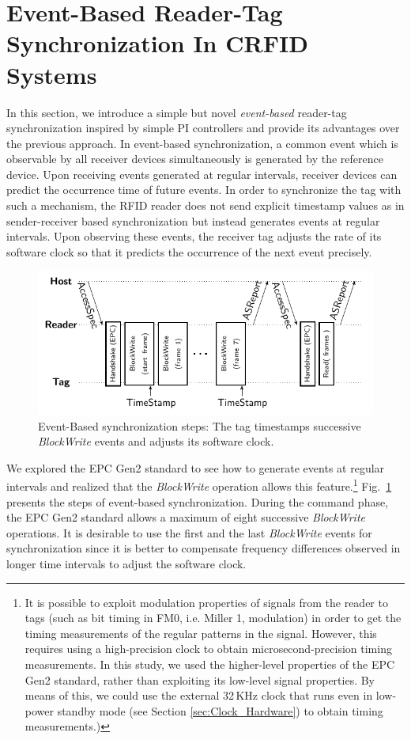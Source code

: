 \documentclass[10pt,journal,compsoc]{IEEEtran}
\begin{document}
\section{Event-Based Reader-Tag Synchronization In CRFID Systems}\label{sec:event_based}

In this section, we introduce a simple but novel \emph{event-based} reader-tag synchronization inspired by simple PI controllers and provide its advantages over the previous approach. In event-based synchronization, a common event which is observable by all receiver devices simultaneously is generated by the reference device. Upon receiving events generated at regular intervals, receiver devices can predict the occurrence time of future events. In order to synchronize the tag with such a mechanism, the RFID reader does not send explicit timestamp values as in sender-receiver based synchronization but instead generates events at regular intervals. Upon observing these events, the receiver tag adjusts the rate of its software clock so that it predicts the occurrence of the next event precisely. 
\begin{figure}
	\centering
	\includegraphics[width=\columnwidth]{figures/Event-Based.pdf}
	\caption{\label{fig:event_based}Event-Based synchronization steps: The tag timestamps successive \emph{BlockWrite} events and adjusts its software clock.}
\end{figure}
We explored the EPC Gen2 standard to see how to generate events at regular intervals and realized that the \emph{BlockWrite} operation allows this feature.\footnote{It is possible to exploit modulation properties of signals from the reader to tags (such as bit timing in FM0, i.e. Miller 1, modulation) in order to get the timing measurements of the regular patterns in the signal. However, this requires using a high-precision clock to obtain microsecond-precision timing measurements. In this study, we used the higher-level properties of the EPC Gen2 standard, rather than exploiting its low-level signal properties. By means of this, we could  use the external 32\,KHz clock that runs even in low-power standby mode (see Section \ref{sec:Clock_Hardware}) to obtain timing measurements.)} Fig.~\ref{fig:event_based} presents the steps of event-based synchronization. During the command phase, the EPC Gen2 standard allows a maximum of eight successive \emph{BlockWrite} operations. It is desirable to use the first and the last \emph{BlockWrite} events for synchronization since it is better to compensate frequency differences observed in longer time intervals to adjust the software clock. 
\end{document}
